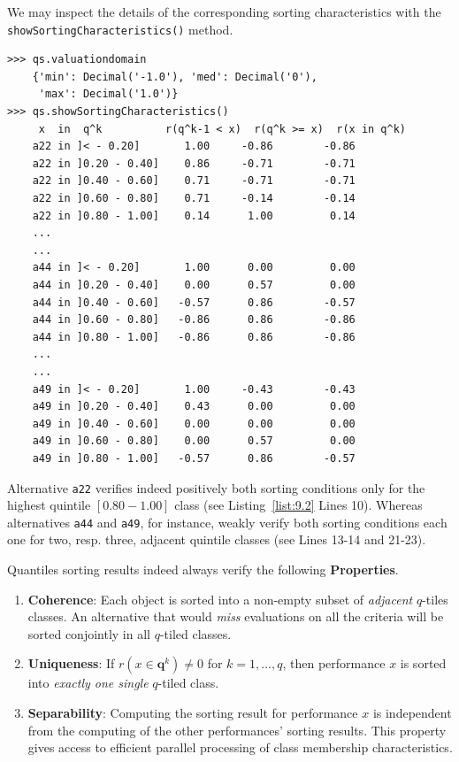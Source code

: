 We may inspect the details of the corresponding sorting characteristics with the \texttt{showSortingCharacteristics()} method.
\begin{lstlisting}[caption={Bipolar-valued sorting characteristics (extract)},label=list:9.2]
>>> qs.valuationdomain
    {'min': Decimal('-1.0'), 'med': Decimal('0'),
     'max': Decimal('1.0')}
>>> qs.showSortingCharacteristics()
     x  in  q^k          r(q^k-1 < x)  r(q^k >= x)  r(x in q^k)
    a22 in ]< - 0.20]	    1.00	 -0.86	      -0.86
    a22 in ]0.20 - 0.40]    0.86	 -0.71	      -0.71
    a22 in ]0.40 - 0.60]    0.71	 -0.71	      -0.71
    a22 in ]0.60 - 0.80]    0.71	 -0.14	      -0.14
    a22 in ]0.80 - 1.00]    0.14	  1.00	       0.14
    ...
    ...
    a44 in ]< - 0.20]	    1.00	  0.00	       0.00
    a44 in ]0.20 - 0.40]    0.00	  0.57	       0.00
    a44 in ]0.40 - 0.60]   -0.57	  0.86	      -0.57
    a44 in ]0.60 - 0.80]   -0.86	  0.86	      -0.86
    a44 in ]0.80 - 1.00]   -0.86	  0.86	      -0.86
    ...
    ...
    a49 in ]< - 0.20]	    1.00	 -0.43	      -0.43
    a49 in ]0.20 - 0.40]    0.43	  0.00	       0.00
    a49 in ]0.40 - 0.60]    0.00	  0.00	       0.00
    a49 in ]0.60 - 0.80]    0.00	  0.57	       0.00
    a49 in ]0.80 - 1.00]   -0.57	  0.86	      -0.57
\end{lstlisting}
Alternative \texttt{a22} verifies indeed positively both sorting conditions only for the highest quintile $[0.80 - 1.00]$ class (see Listing~\vref{list:9.2} Lines 10). Whereas alternatives \texttt{a44} and \texttt{a49}, for instance, weakly verify both sorting conditions each one for two, resp. three, adjacent quintile classes (see Lines 13-14 and 21-23).  

Quantiles sorting results indeed always verify the following \textbf{Properties}.
\begin{enumerate}[leftmargin=0.5cm,rightmargin=0.5cm]
\item \textbf{Coherence}: Each object is sorted into a non-empty subset of \emph{adjacent} $q$-tiles classes. An alternative that would \emph{miss} evaluations on all the criteria will be sorted conjointly in all $q$-tiled classes.
\item \textbf{Uniqueness}: If $r(x \in \mathbf{q}^k) \neq 0$  for $k = 1, ..., q$, then performance $x$ is sorted into \emph{exactly one single} $q$-tiled class.
\item \textbf{Separability}: Computing the sorting result for performance $x$ is independent from the computing of the other performances’ sorting results. This property gives access to efficient parallel processing of class membership characteristics.
\end{enumerate}

